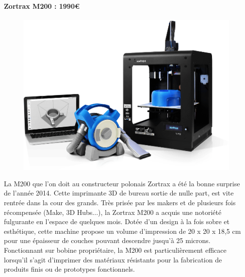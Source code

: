 \documentclass{article}
\begin{document}
\paragraph{Zortrax M200 : 1990\euro{}} \hfill \break
\begin{figure}[h!]
\centering
\includegraphics[scale=0.4]{./images/zortrax-M200.png}
\end{figure}\hfill \break
La M200 que l'on doit au constructeur polonais Zortrax a été la bonne surprise de l'année 2014. Cette imprimante 3D de bureau sortie de nulle part, est vite rentrée dans la cour des grands. Très prisée par les makers et de plusieurs fois récompensée (Make, 3D Hubs...), la Zortrax M200 a acquis une notoriété fulgurante en l'espace de quelques mois. Dotée d'un design à la fois sobre et esthétique, cette machine propose un volume d'impression de 20 x 20 x 18,5 cm pour une épaisseur de couches pouvant descendre jusqu'à 25 microns. Fonctionnant sur bobine propriétaire, la M200 est particulièrement efficace lorsqu'il s'agit d'imprimer des matériaux résistants pour la fabrication de produits finis ou de prototypes fonctionnels.
\end{document}
